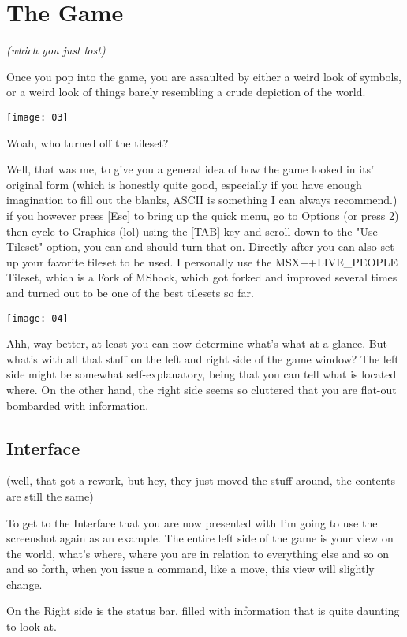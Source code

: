 \chapter{The Game}
\textit{(which you just lost)}

Once you pop into the game, you are assaulted by either a weird look of symbols, or a weird look of things barely resembling a crude depiction of the world.

\texttt{[image: 03]}

Woah, who turned off the tileset?

Well, that was me, to give you a general idea of how the game looked in its' original form (which is honestly quite good, especially if you have enough imagination to fill out the blanks, ASCII is something I can always recommend.) if you however press [Esc] to bring up the quick menu, go to Options (or press 2) then cycle to Graphics (lol) using the [TAB] key and scroll down to the "Use Tileset" option, you can and should turn that on. Directly after you can also set up your favorite tileset to be used. I personally use the MSX++LIVE\_PEOPLE Tileset, which is a Fork of MShock, which got forked and improved several times and turned out to be one of the best tilesets so far.

\texttt{[image: 04]}

Ahh, way better, at least you can now determine what's what at a glance. But what's with all that stuff on the left and right side of the game window? The left side might be somewhat self-explanatory, being that you can tell what is located where. On the other hand, the right side seems so cluttered that you are flat-out bombarded with information.

\section{Interface}

(well, that got a rework, but hey, they just moved the stuff around, the contents are still the same)

To get to the Interface that you are now presented with I'm going to use the screenshot again as an example.
The entire left side of the game is your view on the world, what's where, where you are in relation to everything else and so on and so forth, when you issue a command, like a move, this view will slightly change.

On the Right side is the status bar, filled with information that is quite daunting to look at.

